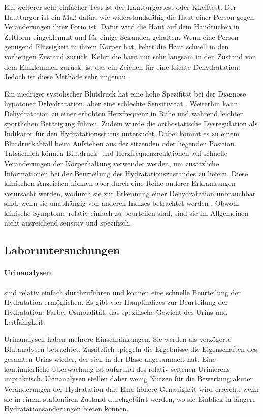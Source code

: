 \documentclass[10pt,a4paper,headinclude,twoside, plainheadsepline, open=right, numbers=noenddot, twocolumn]{article}
\begin{document}
Ein weiterer sehr einfacher Test ist der Hautturgortest oder Kneiftest. 
Der Hautturgor ist ein Maß dafür, wie widerstandsfähig die Haut einer Person gegen Veränderungen ihrer Form ist.
Dafür wird die Haut auf dem Handrücken in Zeltform eingeklemmt und für einige Sekunden gehalten.
Wenn eine Person genügend Flüssigkeit in ihrem Körper hat, kehrt die Haut schnell in den vorherigen Zustand zurück.
Kehrt die haut nur sehr langsam in den Zustand vor dem Einklemmen zurück, ist das ein Zeichen für eine leichte Dehydratation.
Jedoch ist diese Methode sehr ungenau \cite{suryadevara2015towards}.

Ein niedriger systolischer Blutdruck hat eine hohe Spezifität bei der Diagnose hypotoner Dehydratation, aber eine schlechte Sensitivität \cite{fortes2015elderly}.
Weiterhin kann Dehydratation zu einer erhöhten Herzfrequenz in Ruhe und während leichten sportlichen Betätigung führen.
Zudem wurde die orthostatische Dysregulation als Indikator für den Hydratationsstatus untersucht. 
Dabei kommt es zu einem Blutdruckabfall beim Aufstehen aus der sitzenden oder liegenden Position.
Tatsächlich können Blutdruck- und Herzfrequenzreaktionen auf schnelle Veränderungen der Körperhaltung verwendet werden, um zusätzliche Informationen bei der Beurteilung des Hydratationszustandes zu liefern.
Diese klinischen Anzeichen können aber durch eine Reihe anderer Erkrankungen verursacht werden, wodurch sie zur Erkennung einer Dehydratation unbrauchbar sind, wenn sie unabhängig von anderen Indizes betrachtet werden
\cite{garret2018engineering, kavouras2002assessing, davis1997effect}.
Obwohl klinische Symptome relativ einfach zu beurteilen sind, sind sie im Allgemeinen nicht ausreichend sensitiv und spezifisch.

\subsection{Laboruntersuchungen}
\label{laboruntersuchungen}

\paragraph{Urinanalysen} sind relativ einfach durchzuführen und können eine schnelle Beurteilung der Hydratation ermöglichen.
Es gibt vier Hauptindizes zur Beurteilung der Hydratation: Farbe, Osmolalität, das spezifische Gewicht des Urins und Leitfähigkeit.

Urinanalysen haben mehrere Einschränkungen.
Sie werden als verzögerte Blutanalysen betrachtet.
Zusätzlich spiegeln die Ergebnisse die Eigenschaften des gesamten Urins wieder, der sich in der Blase angesammelt hat.
Eine kontinuierliche Überwachung ist aufgrund des relativ seltenen Urinierens unpraktisch.
Urinanalysen stellen daher wenig Nutzen für die Bewertung akuter Veränderungen der Hydratation dar.
Eine höhere Genauigkeit wird erreicht, wenn sie in einem stationären Zustand durchgeführt werden, wo sie Einblick in längere Hydratationsänderungen bieten können.
\end{document}
